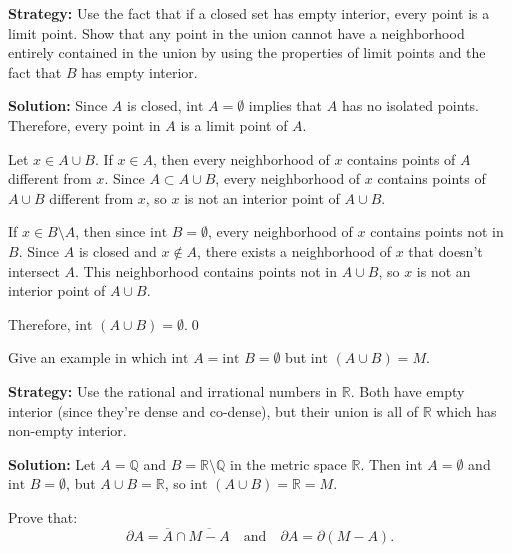 \noindent\textbf{Strategy:} Use the fact that if a closed set has empty interior, every point is a limit point. Show that any point in the union cannot have a neighborhood entirely contained in the union by using the properties of limit points and the fact that $B$ has empty interior.

\bigskip\noindent\textbf{Solution:} Since $A$ is closed, $\text{int } A = \emptyset$ implies that $A$ has no isolated points. Therefore, every point in $A$ is a limit point of $A$.

Let $x \in A \cup B$. If $x \in A$, then every neighborhood of $x$ contains points of $A$ different from $x$. Since $A \subset A \cup B$, every neighborhood of $x$ contains points of $A \cup B$ different from $x$, so $x$ is not an interior point of $A \cup B$.

If $x \in B \setminus A$, then since $\text{int } B = \emptyset$, every neighborhood of $x$ contains points not in $B$. Since $A$ is closed and $x \notin A$, there exists a neighborhood of $x$ that doesn't intersect $A$. This neighborhood contains points not in $A \cup B$, so $x$ is not an interior point of $A \cup B$.

Therefore, $\text{int } (A \cup B) = \emptyset$.\qed


\begin{problembox}
\begin{problemstatement}
Give an example in which \(\text{int } A = \text{int } B = \emptyset\) but \(\text{int } (A \cup B) = M\).
\end{problemstatement}
\end{problembox}

\noindent\textbf{Strategy:} Use the rational and irrational numbers in $\mathbb{R}$. Both have empty interior (since they're dense and co-dense), but their union is all of $\mathbb{R}$ which has non-empty interior.

\bigskip\noindent\textbf{Solution:} Let $A = \mathbb{Q}$ and $B = \mathbb{R} \setminus \mathbb{Q}$ in the metric space $\mathbb{R}$. Then $\text{int } A = \emptyset$ and $\text{int } B = \emptyset$, but $A \cup B = \mathbb{R}$, so $\text{int } (A \cup B) = \mathbb{R} = M$.



\begin{problembox}
\begin{problemstatement}
Prove that:
\[
\partial A = \overline{A} \cap \overline{M - A} \quad \text{and} \quad \partial A = \partial(M - A).
\]
\end{problemstatement}
\end{problembox}


